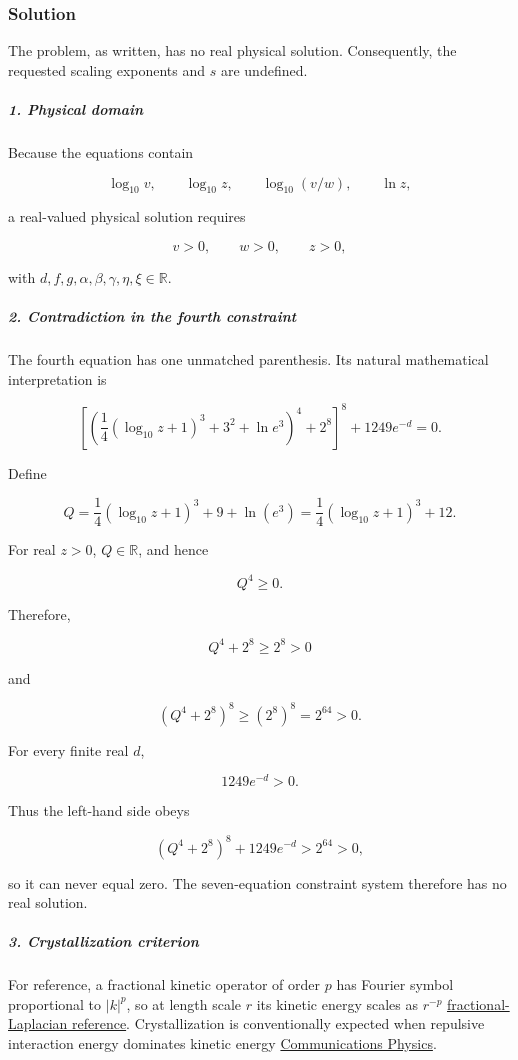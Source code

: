 \subsubsection*{Solution}
The problem, as written, has no real physical solution. Consequently, the requested scaling exponents and $s$ are undefined.

\subparagraph*{1. Physical domain}

Because the equations contain

\[
\log_{10}v,\qquad \log_{10}z,\qquad \log_{10}(v/w),\qquad \ln z,
\]

a real-valued physical solution requires

\[
v>0,\qquad w>0,\qquad z>0,
\]

with $d,f,g,\alpha,\beta,\gamma,\eta,\xi\in\mathbb R$.

\subparagraph*{2. Contradiction in the fourth constraint}

The fourth equation has one unmatched parenthesis. Its natural mathematical interpretation is

\[
\left[ \left( \frac14(\log_{10}z+1)^3+3^2+\ln e^3 \right)^4+2^8 \right]^8 +1249e^{-d}=0.
\]

Define

\[
Q=\frac14(\log_{10}z+1)^3+9+\ln(e^3) =\frac14(\log_{10}z+1)^3+12.
\]

For real $z>0$, $Q\in\mathbb R$, and hence

\[
Q^4\geq 0.
\]

Therefore,

\[
Q^4+2^8\geq 2^8>0
\]

and

\[
\left(Q^4+2^8\right)^8\geq (2^8)^8=2^{64}>0.
\]

For every finite real $d$,

\[
1249e^{-d}>0.
\]

Thus the left-hand side obeys

\[
\left(Q^4+2^8\right)^8+1249e^{-d} >2^{64}>0,
\]

so it can never equal zero. The seven-equation constraint system therefore has no real solution.

\subparagraph*{3. Crystallization criterion}

For reference, a fractional kinetic operator of order $p$ has Fourier symbol proportional to $\lvert k\rvert^p$, so at length scale $r$ its kinetic energy scales as $r^{-p}$ \href{\detokenize{https://arxiv.org/abs/2311.07814}}{fractional-Laplacian reference}. Crystallization is conventionally expected when repulsive interaction energy dominates kinetic energy \href{\detokenize{https://www.nature.com/articles/s42005-022-01095-8}}{Communications Physics}.

